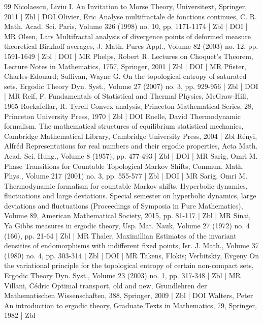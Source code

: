 \documentclass[10pt]{amsart}
\theoremstyle{definition}\newtheorem{defi}[theo]{Definition}\newtheorem{rema}[theo]{Remark}\newtheorem{exam}[theo]{Example}\newtheorem{exem}[theo]{Example}\newtheorem{nota}[theo]{Notation}
\theoremstyle{plain}
\theoremstyle{plain}
\newcounter{In}
\newcommand*\8{\infty}
\begin{document}
\begin{thebibliography}{99}
Nicolaescu, Liviu I. An Invitation to Morse Theory, Universitext, Springer, 2011 | Zbl | DOI
Olivier, Eric Analyse multifractale de fonctions continues, C. R. Math. Acad. Sci. Paris, Volume 326 (1998) no. 10, pp. 1171-1174 | Zbl | DOI | MR
Olsen, Lars Multifractal analysis of divergence points of deformed measure theoretical Birkhoff averages, J. Math. Pures Appl., Volume 82 (2003) no. 12, pp. 1591-1649 | Zbl | DOI | MR
Phelps, Robert R. Lectures on Choquet’s Theorem, Lecture Notes in Mathematics, 1757, Springer, 2001 | Zbl | DOI | MR
Pfister, Charles-Edouard; Sullivan, Wayne G. On the topological entropy of saturated sets, Ergodic Theory Dyn. Syst., Volume 27 (2007) no. 3, pp. 929-956 | Zbl | DOI | MR
Reif, F. Fundamentals of Statistical and Thermal Physics, McGraw-Hill, 1965
Rockafellar, R. Tyrell Convex analysis, Princeton Mathematical Series, 28, Princeton University Press, 1970 | Zbl | DOI
Ruelle, David Thermodynamic formalism. The mathematical structures of equilibrium statistical mechanics, Cambridge Mathematical Library, Cambridge University Press, 2004 | Zbl
Rényi, Alfréd Representations for real numbers and their ergodic properties, Acta Math. Acad. Sci. Hung., Volume 8 (1957), pp. 477-493 | Zbl | DOI | MR
Sarig, Omri M. Phase Transitions for Countable Topological Markov Shifts, Commun. Math. Phys., Volume 217 (2001) no. 3, pp. 555-577 | Zbl | DOI | MR
Sarig, Omri M. Thermodynamic formalism for countable Markov shifts, Hyperbolic dynamics, fluctuations and large deviations. Special semester on hyperbolic dynamics, large deviations and fluctuations (Proceedings of Symposia in Pure Mathematics), Volume 89, American Mathematical Society, 2015, pp. 81-117 | Zbl | MR
Sinai, Ya Gibbs measures in ergodic theory, Usp. Mat. Nauk, Volume 27 (1972) no. 4 (166), pp. 21-64 | Zbl | MR
Thaler, Maximillian Estimates of the invariant densities of endomorphisms with indifferent fixed points, Isr. J. Math., Volume 37 (1980) no. 4, pp. 303-314 | Zbl | DOI | MR
Takens, Flokis; Verbitskiy, Evgeny On the variational principle for the topological entropy of certain non-compact sets, Ergodic Theory Dyn. Syst., Volume 23 (2003) no. 1, pp. 317-348 | Zbl | MR
Villani, Cédric Optimal transport, old and new, Grundlehren der Mathematischen Wissenschaften, 388, Springer, 2009 | Zbl | DOI
Walters, Peter An introduction to ergodic theory, Graduate Texts in Mathematics, 79, Springer, 1982 | Zbl
\end{thebibliography}
\end{document}
